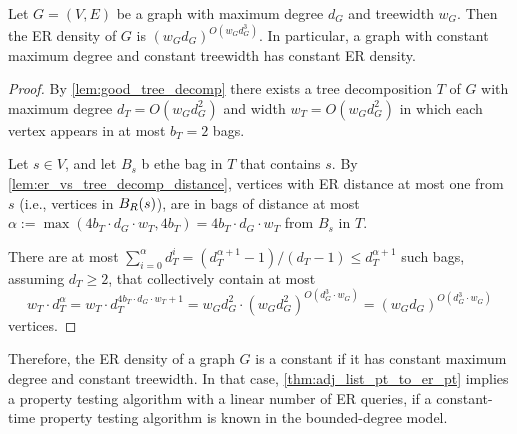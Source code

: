 \begin{theorem}
\label{thm:er_density_tw}
    Let $G=(V,E)$ be a graph with maximum degree $d_G$ and treewidth $w_G$.
    Then the ER density of $G$ is $(w_Gd_G)^{O(w_G d_G^3)}$.  In particular, a graph with constant maximum degree and constant treewidth has constant ER density.
\end{theorem}
\begin{proof}
    By \cref{lem:good_tree_decomp} there exists a tree decomposition $T$ of $G$ with maximum degree $d_T=O(w_Gd_G^2)$ and width $w_T=O(w_Gd_G^2)$ in which each vertex appears in at most $b_T = 2$ bags.

    Let $s\in V$, and let $B_s$ b ethe bag in $T$ that contains $s$.  By \cref{lem:er_vs_tree_decomp_distance}, vertices with ER distance at most one from $s$ (i.e., vertices in $B_{R}(s)$), are in bags of distance at most $\alpha := \max(4b_T\cdot d_G\cdot w_T, 4 b_T) = 4b_T\cdot d_G\cdot w_T$ from $B_s$ in $T$.

    There are at most %
    $
    \sum_{i=0}^{\alpha} d_T^i = {(d_T^{\alpha+1}-1)}/{(d_T - 1)} \leq d_T^{\alpha+1}
    $ 
    such bags, assuming $d_T \geq 2$, that collectively contain at most
    \[
    w_T\cdot d_T^\alpha = 
    w_T\cdot d_T^{4b_T\cdot d_G\cdot w_T + 1} = 
    w_Gd_G^2\cdot (w_Gd_G^2)^{O(d^3_G\cdot w_G)} = 
    (w_Gd_G)^{O(d^3_G\cdot w_G)}
    \]
    vertices.
\end{proof}
Therefore, the ER density of a graph $G$ is a constant if it has constant maximum degree and constant treewidth.  In that case, \cref{thm:adj_list_pt_to_er_pt} implies a property testing algorithm with a linear number of ER queries, if a constant-time property testing algorithm is known in the bounded-degree model.

